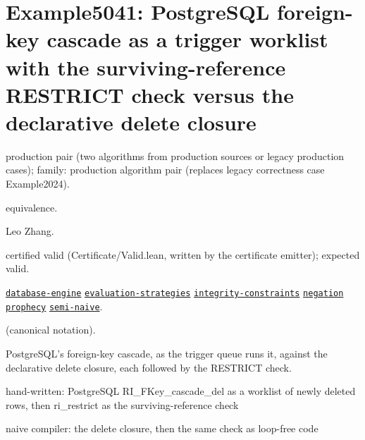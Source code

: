 \documentclass[10pt]{article}
\begin{document}
\Needspace{0.45\textheight}

\section{Example5041: PostgreSQL foreign-key cascade as a trigger worklist with the surviving-reference RESTRICT check versus the declarative delete closure}\label{case:Example5041}

\begin{description}[leftmargin=2.6cm,style=nextline,itemsep=1pt]

\item[Category] production pair (two algorithms from production sources or legacy production cases); family: production algorithm pair (replaces legacy correctness case Example2024).

\item[Kind] equivalence.

\item[Contributors] Leo Zhang.

\item[Status] certified valid (Certificate/Valid.lean, written by the certificate emitter); expected valid.

\item[Tags] \hyperref[tag:database-engine]{\texttt{database-engine}} \hyperref[tag:evaluation-strategies]{\texttt{evaluation-strategies}} \hyperref[tag:integrity-constraints]{\texttt{integrity-constraints}} \hyperref[tag:negation]{\texttt{negation}} \hyperref[tag:prophecy]{\texttt{prophecy}} \hyperref[tag:semi-naive]{\texttt{semi-naive}}.

\item[Input]  (canonical notation).

\item[Summary] PostgreSQL's foreign-key cascade, as the trigger queue runs it, against the declarative delete closure, each followed by the RESTRICT check.

\item[Sides] hand-written: PostgreSQL RI\_FKey\_cascade\_del as a worklist of newly deleted rows, then ri\_restrict as the surviving-reference check \par naive compiler: the delete closure, then the same check as loop-free code


\end{description}
\end{document}

